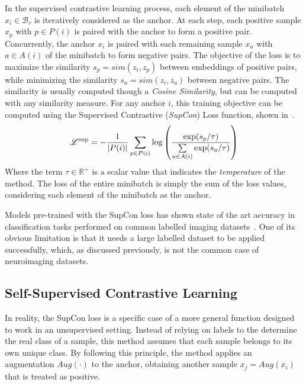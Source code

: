 In the supervised contrastive learning process, each element of the minibatch
$x_i \in \mathcal{B}_r$ is iteratively considered as the anchor. At each step,
each positive sample $x_p$ with $p \in P(i)$ is paired with the anchor to form a
positive pair. Concurrently, the anchor $x_i$ is paired with each remaining
sample $x_a$ with $a \in A(i)$ of the minibatch to form negative pairs. The
objective of the loss is to maximize the similarity $s_p = sim(z_i, z_p)$
between embeddings of positive pairs, while minimizing the similarity $s_a =
sim(z_i, z_a)$ between negative pairs. The similarity is usually computed though
a \emph{Cosine Similarity}, but can be computed with any similarity measure.
For any anchor $i$, this training objective can be computed using the Supervised
Contrastive (\emph{SupCon}) Loss function, shown in~.
\begin{equation}
    \labeq{4_1}
    \mathscr{L}^{\text{sup}} = 
    - \frac{1}{\lvert P(i) \rvert} \sum_{p \in P(i)} \log \left(
        \frac
        {\exp(s_p / \tau)}
        {\sum\limits_{a \in A(i)} \exp(s_a / \tau)}
    \right)
\end{equation}
Where the term $\tau \in \mathbb{R}^+$ is a scalar value that indicates the
\emph{temperature} of
the method. The loss of the entire minibatch is simply the sum of the loss
values, considering each element of the minibatch as the anchor.

Models pre-trained with the SupCon loss has shown state of the art accuracy in
classification tasks performed on common labelled imaging
datasets~\cite{chen_self_contrastive_2020}. One of its obvious limitation is
that it needs a large labelled dataset to be applied successfully, which, as
discussed previously, is not the common case of neuroimaging datasets.

\subsection{Self-Supervised Contrastive Learning}
In reality, the SupCon loss is a specific case of a more general function
designed to work in an unsupervised setting. Instead of relying on labels to the
determine the real class of a sample, this method assumes that each sample
belongs to its own unique class. By following this principle, the method applies
an augmentation $Aug(\cdot)$ to the anchor, obtaining another sample $x_j = Aug(x_i)$
that is treated as positive.

